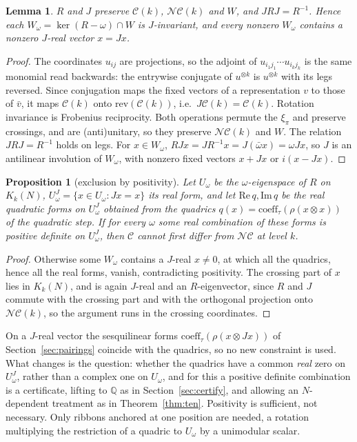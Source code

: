 \documentclass[11pt]{amsart}
\newtheorem{proposition}[theorem]{Proposition}
\newtheorem{lemma}[theorem]{Lemma}
\theoremstyle{definition}
\theoremstyle{remark}
\theoremstyle{plain}
\numberwithin{equation}{section}
\numberwithin{table}{section}
\newcommand{\Q}{\mathbb Q}
\newcommand{\NC}{\mathcal{NC}}
\begin{document}
\begin{lemma}\label{lem:jreal}
$R$ and $J$ preserve $\mathcal C(k)$, $\NC(k)$ and $W$, and $JRJ=R^{-1}$. Hence each $W_\omega=\ker(R-\omega)\cap W$ is $J$-invariant, and every nonzero $W_\omega$ contains a nonzero $J$-real vector $x=Jx$.
\end{lemma}

\begin{proof}
The coordinates $u_{ij}$ are projections, so the adjoint of $u_{i_1j_1}\cdots u_{i_kj_k}$ is the same monomial read backwards: the entrywise conjugate of $u^{\otimes k}$ is $u^{\otimes k}$ with its legs reversed. Since conjugation maps the fixed vectors of a representation $v$ to those of $\bar v$, it maps $\mathcal C(k)$ onto $\mathrm{rev}(\mathcal C(k))$, i.e.\ $J\mathcal C(k)=\mathcal C(k)$. Rotation invariance is Frobenius reciprocity. Both operations permute the $\xi_\pi$ and preserve crossings, and are (anti)unitary, so they preserve $\NC(k)$ and $W$. The relation $JRJ=R^{-1}$ holds on legs. For $x\in W_\omega$, $RJx=JR^{-1}x=J(\bar\omega x)=\omega Jx$, so $J$ is an antilinear involution of $W_\omega$, with nonzero fixed vectors $x+Jx$ or $i(x-Jx)$.
\end{proof}

\begin{proposition}[exclusion by positivity]\label{prop:posS}
Let $U_\omega$ be the $\omega$-eigenspace of $R$ on $K_k(N)$, $U_\omega^J=\{x\in U_\omega:Jx=x\}$ its real form, and let $\mathrm{Re}\,q,\mathrm{Im}\,q$ be the real quadratic forms on $U_\omega^J$ obtained from the quadrics $q(x)=\mathrm{coeff}_\tau(\rho(x\otimes x))$ of the quadratic step. If for every $\omega$ some real combination of these forms is positive definite on $U_\omega^J$, then $\mathcal C$ cannot first differ from $\NC$ at level $k$.
\end{proposition}

\begin{proof}
Otherwise some $W_\omega$ contains a $J$-real $x\ne0$, at which all the quadrics, hence all the real forms, vanish, contradicting positivity. The crossing part of $x$ lies in $K_k(N)$, and is again $J$-real and an $R$-eigenvector, since $R$ and $J$ commute with the crossing part and with the orthogonal projection onto $\NC(k)$, so the argument runs in the crossing coordinates.
\end{proof}

On a $J$-real vector the sesquilinear forms $\mathrm{coeff}_\tau(\rho(x\otimes Jx))$ of Section~\ref{sec:pairings} coincide with the quadrics, so no new constraint is used. What changes is the question: whether the quadrics have a common \emph{real} zero on $U_\omega^J$, rather than a complex one on $U_\omega$, and for this a positive definite combination is a certificate, lifting to $\Q$ as in Section~\ref{sec:certify}, and allowing an $N$-dependent treatment as in Theorem~\ref{thm:ten}. Positivity is sufficient, not necessary. Only ribbons anchored at one position are needed, a rotation multiplying the restriction of a quadric to $U_\omega$ by a unimodular scalar.
\end{document}
